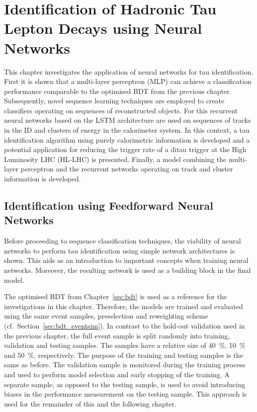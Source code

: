 \chapter{Identification of Hadronic Tau Lepton Decays using Neural Networks}
\label{sec:rnn}

This chapter investigates the application of neural networks for tau
identification. First it is shown that a multi-layer perceptron (MLP) can
achieve a classification performance comparable to the optimised BDT from the
previous chapter. Subsequently, novel sequence learning techniques are employed
to create classifiers operating on sequences of reconstructed objects. For this
recurrent neural networks based on the LSTM architecture are used on sequences
of tracks in the ID and clusters of energy in the calorimeter system. In this
context, a tau identification algorithm using purely calorimetric information is
developed and a potential application for reducing the trigger rate of a ditau
trigger at the High Luminosity LHC (HL-LHC) is presented. Finally, a model
combining the multi-layer perceptron and the recurrent networks operating on
track and cluster information is developed.

\section{Identification using Feedforward Neural Networks}
\label{sec:ffnn_id}

Before proceeding to sequence classification techniques, the viability of neural
networks to perform tau identification using simple network architectures is
shown. This aids as an introduction to important concepts when training neural
networks. Moreover, the resulting network is used as a building block in the
final model.

The optimised BDT from Chapter~\ref{sec:bdt} is used as a reference for the
investigations in this chapter. Therefore, the models are trained and evaluated
using the same event samples, preselection and reweighting scheme (cf.\
Section~\ref{sec:bdt_eventsim}). In contrast to the hold-out validation used in
the previous chapter, the full event sample is split randomly into training,
validation and testing samples. The samples have a relative size of
\SI{40}{\percent}, \SI{10}{\percent} and \SI{50}{\percent}, respectively. The
purpose of the training and testing samples is the same as before. The
validation sample is monitored during the training process and used to perform
model selection and early stopping of the training. A separate sample, as
opposed to the testing sample, is used to avoid introducing biases in the
performance measurement on the testing sample. This approach is used for the
remainder of this and the following chapter.

